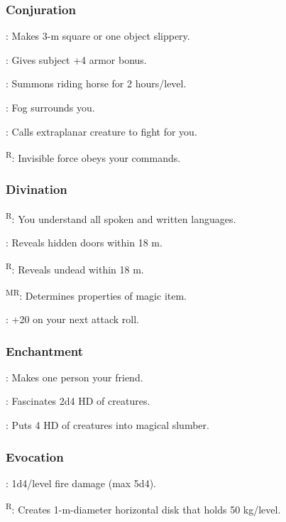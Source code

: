 \subsubsection{Conjuration}

	: Makes 3-m square or one object slippery.

	: Gives subject +4 armor bonus.

	: Summons riding horse for 2 hours/level.

	: Fog surrounds you.

	: Calls extraplanar creature to fight for you.

	\textsuperscript{R}: Invisible force obeys your commands.

\subsubsection{Divination}
	\textsuperscript{R}: You understand all spoken and written languages.

	: Reveals hidden doors within 18 m.

	\textsuperscript{R}: Reveals undead within 18 m.

	\textsuperscript{MR}: Determines properties of magic item.

	: +20 on your next attack roll.

\subsubsection{Enchantment}
	: Makes one person your friend.

	: Fascinates 2d4 HD of creatures.

	: Puts 4 HD of creatures into magical slumber.

\subsubsection{Evocation}
	: 1d4/level fire damage (max 5d4).

	\textsuperscript{R}: Creates 1-m-diameter horizontal disk that holds 50 kg/level.

